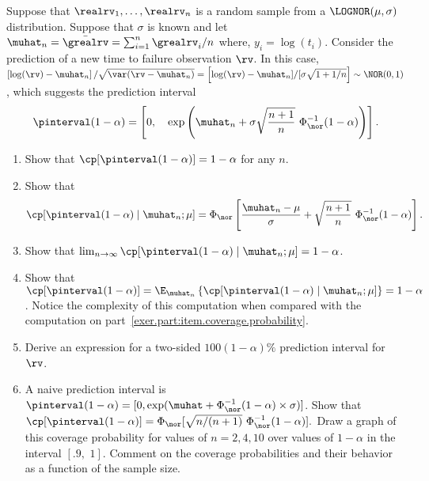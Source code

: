\begin{exercise}
\label{exercise:pi.normal.sigma.known}
Suppose that $\realrv_{1}, \dots, \realrv_{n}$ is a random sample from
a $\LOGNOR(\mu, \sigma)$ distribution.  Suppose that $\sigma$ is known and let
$\muhat_{n}=\bar{\grealrv}=\sum_{i=1}^{n}\grealrv_{i}/n$ where,
$y_{i}=\log(t_{i})$.  Consider the prediction of a new time to failure
observation $\rv$.  In this case, $\left [\log(\rv)
-\muhat_{n} \right ]/\sqrt{\var(\rv -\muhat_{n})} = \left [\log(\rv)
-\muhat_{n}]/[\sigma \sqrt{1+1/n} \right ]
\sim \NOR(0,1)$, which suggests the prediction interval
\begin{displaymath}
\pinterval(1-\alpha)=
\left [0, \quad
\exp \left (\muhat_{n}+\sigma \sqrt{\frac{n+1}{n}}\, \, 
	\Phi^{-1}_{\nor}(1-\alpha)
\right )
\right ].
\end{displaymath}
\begin{enumerate}
\item
\label{exer.part:item.coverage.probability}
Show that $\cp[\pinterval(1-\alpha)]=1-\alpha$ for any $n$.
\item
Show that 
\begin{displaymath}
\cp[\pinterval(1-\alpha) \mid \muhat_{n} ; \mu]
=
\Phi_{\nor} \left [
\frac{\muhat_{n}-\mu}{\sigma}
+ \sqrt{\frac{n+1}{n}}\,\, \Phi^{-1}_{\nor}(1-\alpha) 	 \right ].
\end{displaymath}
\item
Show that $\lim_{n \to \infty}\cp[\pinterval(1-\alpha) \mid \muhat_{n} ;
\mu]=1-\alpha$.
\item
Show that $\cp[\pinterval(1-\alpha)] =\E_{\muhat_{n}}
\left \{
\cp[\pinterval(1-\alpha) \mid \muhat_{n} ; \mu]
\right \}=1-\alpha$. Notice the complexity of this computation
when compared with the computation on
part~\ref{exer.part:item.coverage.probability}.
\item
Derive an expression for a two-sided $100(1-\alpha)\%$ prediction
interval for $\rv$.
\item
A naive prediction interval is $\pinterval(1-\alpha)=[0,
\exp(\muhat+ \Phi^{-1}_{\nor}(1-\alpha) \times \sigma)]$.  Show that
$\cp[\pinterval(1-\alpha)]=
\Phi_{\nor}[\sqrt{n/(n+1)} \, \, \Phi^{-1}_{\nor}(1-\alpha)].$
Draw a graph of this coverage probability for values of $n=2,4,10$
over values of $1-\alpha$ in the interval $[.9,\,\, 1]$.  Comment on the
coverage probabilities and their behavior as a function of the sample
size.
\end{enumerate}
\end{exercise}


